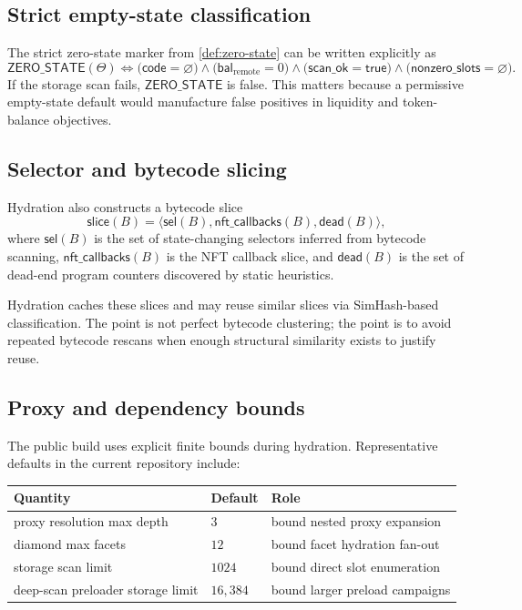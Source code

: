 \documentclass[11pt]{article}
\numberwithin{equation}{section}
\theoremstyle{remark}
\newcommand{\Ctx}{\Theta}
\newcommand{\Selectors}{\mathsf{sel}}
\newcommand{\DeadEnds}{\mathsf{dead}}
\newcommand{\ZeroState}{\mathsf{ZERO\_STATE}}
\begin{document}
\subsection{Strict empty-state classification}

The strict zero-state marker from \cref{def:zero-state} can be written explicitly as
\begin{equation}
\label{eq:zero-state}
\ZeroState(\Ctx)
\Longleftrightarrow
\big(
\mathsf{code} = \varnothing
\big)
\land
\big(
\mathsf{bal}_{\mathrm{remote}} = 0
\big)
\land
\big(
\mathsf{scan\_ok} = \mathsf{true}
\big)
\land
\big(
\mathsf{nonzero\_slots} = \varnothing
\big).
\end{equation}
If the storage scan fails, \(\ZeroState\) is false. This matters because a permissive empty-state default would manufacture false positives in liquidity and token-balance objectives.

\subsection{Selector and bytecode slicing}

Hydration also constructs a bytecode slice
\begin{equation}
\label{eq:bytecode-slice}
\mathsf{slice}(B)
=
\langle
\Selectors(B),
\mathsf{nft\_callbacks}(B),
\DeadEnds(B)
\rangle,
\end{equation}
where \(\Selectors(B)\) is the set of state-changing selectors inferred from bytecode scanning, \(\mathsf{nft\_callbacks}(B)\) is the NFT callback slice, and \(\DeadEnds(B)\) is the set of dead-end program counters discovered by static heuristics.

Hydration caches these slices and may reuse similar slices via SimHash-based classification. The point is not perfect bytecode clustering; the point is to avoid repeated bytecode rescans when enough structural similarity exists to justify reuse.

\subsection{Proxy and dependency bounds}

The public build uses explicit finite bounds during hydration. Representative defaults in the current repository include:
\begin{center}
\begin{tabular}{lll}
\toprule
Quantity & Default & Role \\
\midrule
proxy resolution max depth & \(3\) & bound nested proxy expansion \\
diamond max facets & \(12\) & bound facet hydration fan-out \\
storage scan limit & \(1024\) & bound direct slot enumeration \\
deep-scan preloader storage limit & \(16{,}384\) & bound larger preload campaigns \\
\bottomrule
\end{tabular}
\end{center}
\end{document}
